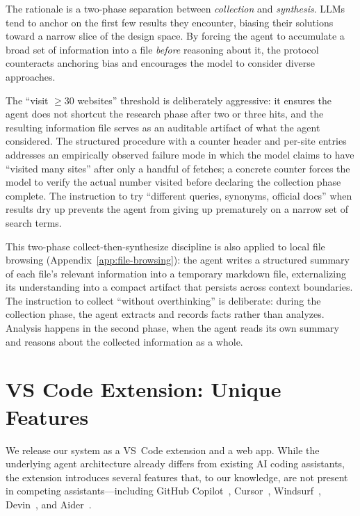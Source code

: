 \documentclass{article}
\begin{document}
\noindent The rationale is a two-phase separation between \emph{collection} and \emph{synthesis}.  LLMs tend to anchor on the first few results they encounter, biasing their solutions toward a narrow slice of the design space.  By forcing the agent to accumulate a broad set of information into a file \emph{before} reasoning about it, the protocol counteracts anchoring bias and encourages the model to consider diverse approaches.

The ``visit $\geq$30 websites'' threshold is deliberately aggressive: it ensures the agent does not shortcut the research phase after two or three hits, and the resulting information file serves as an auditable artifact of what the agent considered.  The structured procedure with a counter header and per-site entries addresses an empirically observed failure mode in which the model claims to have ``visited many sites'' after only a handful of fetches; a concrete counter forces the model to verify the actual number visited before declaring the collection phase complete.  The instruction to try ``different queries, synonyms, official docs'' when results dry up prevents the agent from giving up prematurely on a narrow set of search terms.

This two-phase collect-then-synthesize discipline is also applied to local file browsing (Appendix~\ref{app:file-browsing}): the agent writes a structured summary of each file's relevant information into a temporary markdown file, externalizing its understanding into a compact artifact that persists across context boundaries.  The instruction to collect ``without overthinking'' is deliberate: during the collection phase, the agent extracts and records facts rather than analyzes.  Analysis happens in the second phase, when the agent reads its own summary and reasons about the collected information as a whole.

\section{VS Code Extension: Unique Features}
\label{sec:vscode-features}

We release our system as a VS~Code extension and a web app.  While the underlying agent architecture already differs from existing AI coding assistants, the extension introduces several features that, to our knowledge, are not present in competing assistants---including GitHub Copilot~\citep{copilot2021}, Cursor~\citep{cursor2024}, Windsurf~\citep{windsurf2024}, Devin~\citep{devin2024}, and Aider~\citep{aider2023}.
\end{document}
